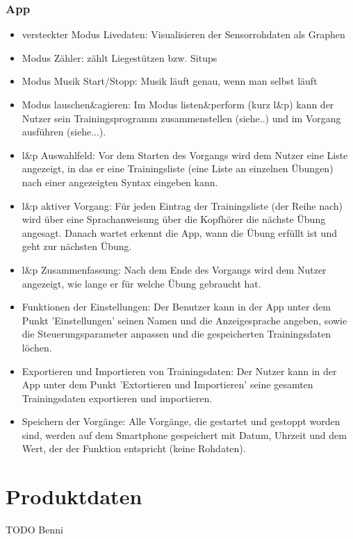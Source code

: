 \documentclass[a4paper,12pt]{article}
\begin{document}
    \subsubsection{App}
    \begin{itemize}
      
      \item[] \textsf{versteckter Modus Livedaten:} Visualisieren der Sensorrohdaten als Graphen    
      \item[] \textsf{Modus Zähler:} zählt Liegestützen bzw. Situps
      \item[] \textsf{Modus Musik Start/Stopp:} Musik läuft genau, wenn man selbst läuft
      \item[] \textsf{Modus lauschen\&agieren:} Im Modus listen\&perform (kurz l\&p) kann der Nutzer sein Trainingsprogramm zusammenstellen (siehe..) und im Vorgang ausführen (siehe...). 
      \item[] \textsf{l\&p Auswahlfeld:} Vor dem Starten des Vorgangs wird dem Nutzer eine Liste angezeigt, in das er eine Trainingsliste (eine Liste an einzelnen Übungen) nach einer angezeigten Syntax eingeben kann.
      \item[] \textsf{l\&p aktiver Vorgang:} Für jeden Eintrag der Trainingsliste (der Reihe nach) wird über eine Sprachanweisung über die Kopfhörer die nächste Übung angesagt. Danach wartet erkennt die App, wann die Übung erfüllt ist und geht zur nächsten Übung.
      \item[] \textsf{l\&p Zusammenfassung:} Nach dem Ende des Vorgangs wird dem Nutzer angezeigt, wie lange er für welche Übung gebraucht hat.
      \item[] \textsf{Funktionen der Einstellungen:} Der Benutzer kann in der App unter dem Punkt 'Einstellungen' seinen Namen und die Anzeigesprache angeben, sowie die Steuerungsparameter anpassen und die gespeicherten Trainingsdaten löchen.
      \item[] \textsf{Exportieren und Importieren von Trainingsdaten:} Der Nutzer kann in der App unter dem Punkt 'Extortieren und Importieren' seine gesamten Trainingsdaten exportieren und importieren.
      \item[] \textsf{Speichern der Vorgänge:} Alle Vorgänge, die gestartet und gestoppt worden sind, werden auf dem Smartphone gespeichert mit Datum, Uhrzeit und dem Wert, der der Funktion entspricht (keine Rohdaten).   
    \end{itemize}


\section{Produktdaten}
TODO Benni
\end{document}
